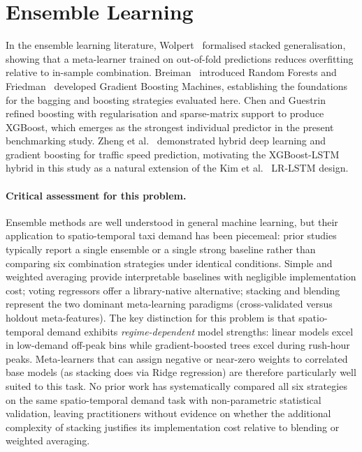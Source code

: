 \section{Ensemble Learning}

In the ensemble learning literature, Wolpert~\parencite{wolpert1992stacking} formalised stacked generalisation, showing that a meta-learner trained on out-of-fold predictions reduces overfitting relative to in-sample combination. Breiman~\parencite{breiman2001rf} introduced Random Forests and Friedman~\parencite{friedman2001gbm} developed Gradient Boosting Machines, establishing the foundations for the bagging and boosting strategies evaluated here. Chen and Guestrin~\parencite{chen2016xgboost} refined boosting with regularisation and sparse-matrix support to produce XGBoost, which emerges as the strongest individual predictor in the present benchmarking study. Zheng et al.~\parencite{zheng2020hybrid} demonstrated hybrid deep learning and gradient boosting for traffic speed prediction, motivating the XGBoost-LSTM hybrid in this study as a natural extension of the Kim et al.~\parencite{kim2020hybrid} LR-LSTM design.

\paragraph{Critical assessment for this problem.} Ensemble methods are well understood in general machine learning, but their application to spatio-temporal taxi demand has been piecemeal: prior studies typically report a single ensemble or a single strong baseline rather than comparing six combination strategies under identical conditions. Simple and weighted averaging provide interpretable baselines with negligible implementation cost; voting regressors offer a library-native alternative; stacking and blending represent the two dominant meta-learning paradigms (cross-validated versus holdout meta-features). The key distinction for this problem is that spatio-temporal demand exhibits \emph{regime-dependent} model strengths: linear models excel in low-demand off-peak bins while gradient-boosted trees excel during rush-hour peaks. Meta-learners that can assign negative or near-zero weights to correlated base models (as stacking does via Ridge regression) are therefore particularly well suited to this task. No prior work has systematically compared all six strategies on the same spatio-temporal demand task with non-parametric statistical validation, leaving practitioners without evidence on whether the additional complexity of stacking justifies its implementation cost relative to blending or weighted averaging.

